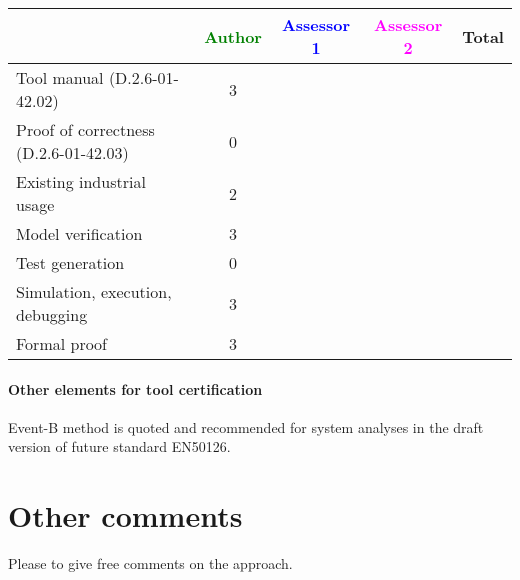 \begin{tabular}{|l | c | c | c | c|}
\hline
& \textcolor{green}{Author} & \textcolor{blue}{Assessor 1} & \textcolor{magenta}{Assessor 2} & Total \\
\hline 
Tool manual (D.2.6-01-42.02) & 3 & & &  \\
\hline
Proof of correctness (D.2.6-01-42.03)   & 0 & & & \\
\hline
Existing industrial  usage  & 2 & & & \\
\hline
Model verification & 3 & & & \\
\hline
Test generation & 0 & & & \\
\hline
Simulation, execution, debugging & 3 & & & \\
\hline
Formal proof &3  & & & \\
\hline
\end{tabular}

\paragraph{Other elements for tool certification}

\begin{author_comment}
Event-B method is quoted and recommended for system analyses in the draft version of future standard EN50126.

\end{author_comment}

\section{Other comments}
Please to  give free comments on the approach.



